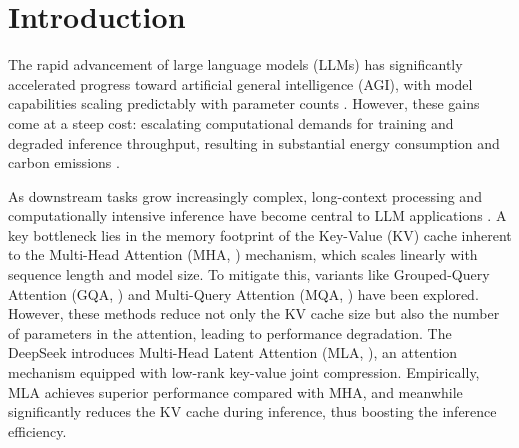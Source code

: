 \section{Introduction}
\label{sec:intro}




The rapid advancement of large language models (LLMs) has significantly accelerated progress toward artificial general intelligence (AGI), with model capabilities scaling predictably with parameter counts \cite{corr/abs-2001-08361}. 
However, these gains come at a steep cost: escalating computational demands for training and degraded inference throughput, resulting in substantial energy consumption and carbon emissions \cite{strubell-etal-2019-energy}. 


As downstream tasks grow increasingly complex, long-context processing and computationally intensive inference have become central to LLM applications
\cite{acl/AnG0ZLZKQ24}. 
A key bottleneck lies in the memory footprint of the Key-Value (KV) cache inherent to the Multi-Head Attention (MHA, \citeyear{nips/VaswaniSPUJGKP17}) mechanism, which scales linearly with sequence length and model size. 
To mitigate this, variants like Grouped-Query Attention (GQA, \citeyear{emnlp/AinslieLJZLS23})  and Multi-Query Attention (MQA, \citeyear{corr/abs-1911-02150})  have been explored. 
However, these methods reduce not only the KV cache size but also the number of parameters in the attention, leading to performance degradation.
The DeepSeek introduces Multi-Head Latent Attention (MLA, \citeyear{corr/abs-2405-04434}), an attention mechanism equipped with low-rank key-value joint compression. 
Empirically, MLA achieves superior performance compared with MHA, and meanwhile significantly reduces the KV cache during inference, thus boosting the inference efficiency. 

